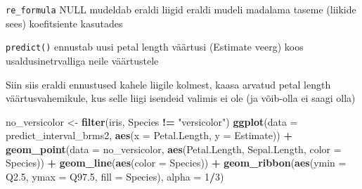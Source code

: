 \documentclass[]{book}
\newenvironment{Shaded}{\begin{snugshade}}{\end{snugshade}}
\newcommand{\CommentTok}[1]{\textcolor[rgb]{0.56,0.35,0.01}{\textit{#1}}}
\newcommand{\DataTypeTok}[1]{\textcolor[rgb]{0.13,0.29,0.53}{#1}}
\newcommand{\DecValTok}[1]{\textcolor[rgb]{0.00,0.00,0.81}{#1}}
\newcommand{\FloatTok}[1]{\textcolor[rgb]{0.00,0.00,0.81}{#1}}
\newcommand{\KeywordTok}[1]{\textcolor[rgb]{0.13,0.29,0.53}{\textbf{#1}}}
\newcommand{\NormalTok}[1]{#1}
\newcommand{\OperatorTok}[1]{\textcolor[rgb]{0.81,0.36,0.00}{\textbf{#1}}}
\newcommand{\OtherTok}[1]{\textcolor[rgb]{0.56,0.35,0.01}{#1}}
\newcommand{\StringTok}[1]{\textcolor[rgb]{0.31,0.60,0.02}{#1}}
\begin{document}
\texttt{re\_formula} NULL mudeldab eraldi liigid eraldi mudeli madalama taseme (liikide sees) koefitsiente kasutades

\begin{Shaded}
\end{Shaded}

\texttt{predict()} ennustab uusi petal length väärtusi (Estimate veerg) koos usaldusinetrvalliga neile väärtustele

Siin siis eraldi ennustused kahele liigile kolmest, kaasa arvatud petal length väärtusvahemikule, kus selle liigi isendeid valimis ei ole (ja võib-olla ei saagi olla)

\begin{Shaded}
\begin{Highlighting}[]
\NormalTok{no_versicolor <-}\StringTok{ }\KeywordTok{filter}\NormalTok{(iris, Species }\OperatorTok{!=}\StringTok{ "versicolor"}\NormalTok{)}
\KeywordTok{ggplot}\NormalTok{(}\DataTypeTok{data =}\NormalTok{ predict_interval_brms2, }\KeywordTok{aes}\NormalTok{(}\DataTypeTok{x =}\NormalTok{ Petal.Length, }\DataTypeTok{y =}\NormalTok{ Estimate)) }\OperatorTok{+}
\StringTok{  }\KeywordTok{geom_point}\NormalTok{(}\DataTypeTok{data =}\NormalTok{ no_versicolor, }\KeywordTok{aes}\NormalTok{(Petal.Length, Sepal.Length, }\DataTypeTok{color =}\NormalTok{ Species)) }\OperatorTok{+}
\StringTok{  }\KeywordTok{geom_line}\NormalTok{(}\KeywordTok{aes}\NormalTok{(}\DataTypeTok{color =}\NormalTok{ Species)) }\OperatorTok{+}
\StringTok{  }\KeywordTok{geom_ribbon}\NormalTok{(}\KeywordTok{aes}\NormalTok{(}\DataTypeTok{ymin =}\NormalTok{ Q2}\FloatTok{.5}\NormalTok{, }\DataTypeTok{ymax =}\NormalTok{ Q97}\FloatTok{.5}\NormalTok{, }\DataTypeTok{fill =}\NormalTok{ Species), }\DataTypeTok{alpha =} \DecValTok{1}\OperatorTok{/}\DecValTok{3}\NormalTok{)}
\end{Highlighting}
\end{Shaded}
\end{document}
